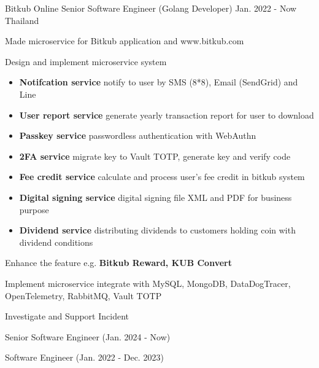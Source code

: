 

\begin{cventries}
  \cventry
  {Bitkub Online} %
  {Senior Software Engineer (Golang Developer)} %
  {Jan. 2022 - Now} %
  {Thailand} %
  {
    \begin{cvitems} %
      \item {Made microservice for Bitkub application and www.bitkub.com}
      \item {Design and implement microservice system}
      \begin{itemize}[label=-]
        \item {\textbf{Notifcation service} notify to user by SMS (8*8), Email (SendGrid) and Line}
        \item {\textbf{User report service} generate yearly transaction report for user to download}
        \item {\textbf{Passkey service} passwordless authentication with WebAuthn}
        \item {\textbf{2FA service} migrate key to Vault TOTP, generate key and verify code}
        \item {\textbf{Fee credit service} calculate and process user's fee credit in bitkub system}
        \item {\textbf{Digital signing service} digital signing file XML and PDF for business purpose}
        \item {\textbf{Dividend service} distributing dividends to customers holding coin with dividend conditions}
      \end{itemize}
      \item {Enhance the feature e.g. \textbf{Bitkub Reward, KUB Convert}}
      \item {Implement microservice integrate with MySQL, MongoDB, DataDogTracer, OpenTelemetry, RabbitMQ, Vault TOTP}  
      \item {Investigate and Support Incident}
      \item {Senior Software Engineer (Jan. 2024 - Now)}
      \item {Software Engineer (Jan. 2022 - Dec. 2023)}
    \end{cvitems}
  }


\end{cventries}
